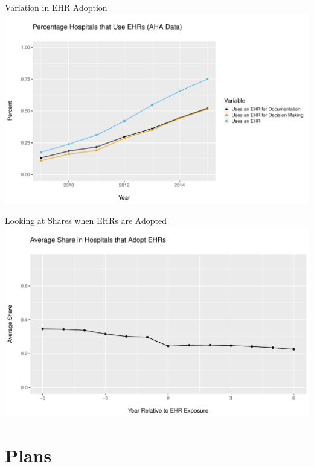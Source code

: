 \documentclass[10pt]{beamer}
\begin{document}
\begin{frame}{Variation in EHR Adoption}
\centering
\includegraphics[scale=.53]{Objects/TYP_plot_hospEHR_year.pdf}
\end{frame}

\begin{frame}{Looking at Shares when EHRs are Adopted}
    \centering
    \includegraphics[scale=.5]{Objects/relyear_treatment.pdf}
\end{frame}





\section{Plans}
\end{document}
